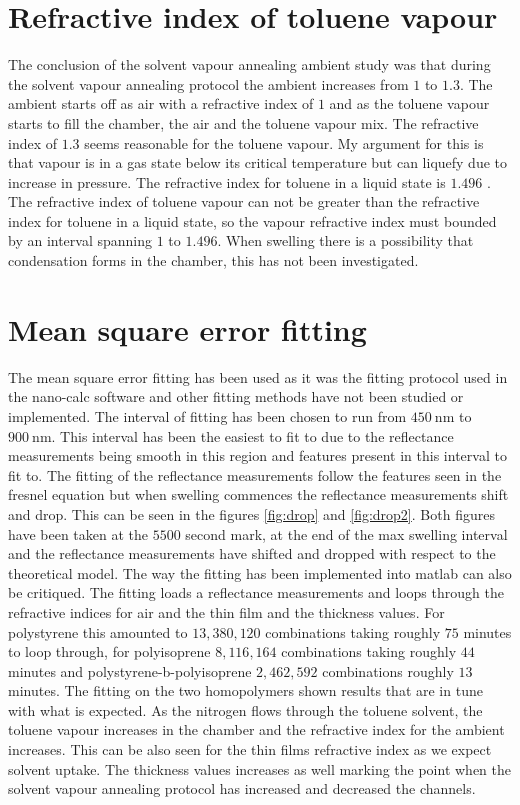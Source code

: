 \documentclass[MasterThesisMain.tex]{subfiles}
\begin{document}
\section{Refractive index of toluene vapour}   
The conclusion of the solvent vapour annealing ambient study was that during the solvent vapour annealing protocol the ambient increases from $1$ to $1.3$. The ambient starts off as air with a refractive index of $1$ and as the toluene vapour starts to fill the chamber, the air and the toluene vapour mix. The refractive index of $1.3$ seems reasonable for the toluene vapour. My argument for this is that vapour is in a gas state below its critical temperature but can liquefy due to increase in pressure. The refractive index for toluene in a liquid state is $1.496$ \cite{toluene}. The refractive index of toluene vapour can not be greater than the refractive index for toluene in a liquid state, so the vapour refractive index must bounded by an interval spanning $1$ to $1.496$. When swelling there is a possibility that condensation forms in the chamber, this has not been investigated.  

\section{Mean square error fitting}
The mean square error fitting has been used as it was the fitting protocol used in the nano-calc software and other fitting methods have not been studied or implemented. The interval of fitting has been chosen to run from $\SI{450}{\nano\meter}$ to $\SI{900}{\nano\meter}$. This interval has been the easiest to fit to due to the reflectance measurements being smooth in this region and features present in this interval to fit to. The fitting of the reflectance measurements follow the features seen in the fresnel equation but when swelling commences the reflectance measurements shift and drop. This can be seen in the figures \ref{fig:drop} and \ref{fig:drop2}. Both figures have been taken at the $5500$ second mark, at the end of the max swelling interval and the reflectance measurements have shifted and dropped with respect to the theoretical model. The way the fitting has been implemented into matlab can also be critiqued. The fitting loads a reflectance measurements and loops through the refractive indices for air and the thin film and the thickness values. For polystyrene this amounted to $13,380,120$ combinations taking roughly $75$ minutes to loop through, for polyisoprene $8,116,164$ combinations taking roughly $44$ minutes and polystyrene-b-polyisoprene $2,462,592$ combinations roughly $13$ minutes. The fitting on the two homopolymers shown results that are in tune with what is expected. As the nitrogen flows through the toluene solvent, the toluene vapour increases in the chamber and the refractive index for the ambient increases. This can be also seen for the thin films refractive index as we expect solvent uptake. The thickness values increases as well marking the point when the solvent vapour annealing protocol has increased and decreased the channels. 
\end{document}
